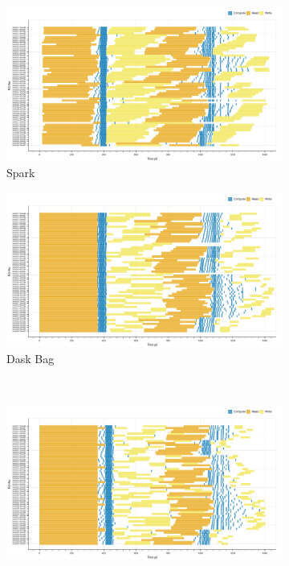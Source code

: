 \documentclass[conference]{IEEEtran}
\begin{document}
\begin{figure}[!htb]
    \centering
    \begin{subfigure}[b]{\columnwidth}
        \includegraphics[clip,width=\columnwidth]{images/spark_inc_gantt.png}
        \caption{Spark}\label{fig:inc_spark_gantt}
    \end{subfigure}
    \hfill
    \begin{subfigure}[b]{\columnwidth}
        \includegraphics[clip,width=\columnwidth]{images/bag_inc_gantt.png}%
        \caption{Dask Bag}\label{fig:inc_dask_bag_gantt}
    \end{subfigure}
    \\
    \begin{subfigure}[b]{\columnwidth}
        \includegraphics[clip,width=\columnwidth]{images/delayed_inc_gantt.png}%

\end{subfigure}
\end{figure}
\end{document}
